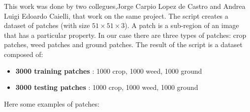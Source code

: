 \documentclass[]{report}
\begin{document}
This work was done by two collegues,Jorge Carpio Lopez de Castro and Andrea Luigi Edoardo Caielli, that work on the same project. 
The script creates a dataset of patches (with size $ 51\times51\times3 $). A patch is a sub-region of an image that has a particular property. In our case there are three types of patches: crop patches, weed patches and ground patches. The result of the script is a dataset composed of:

\begin{itemize}
	\item \textbf{3000 training patches} : 1000 crop, 1000 weed, 1000 ground 
	\item \textbf{3000 testing patches} : 1000 crop, 1000 weed, 1000 ground
\end{itemize}

Here some examples of patches:
\end{document}

